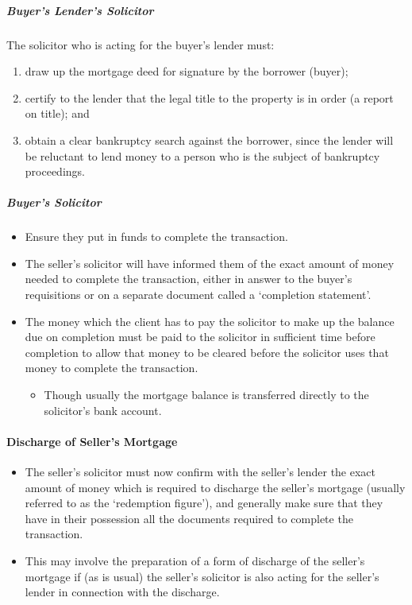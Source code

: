 \documentclass[
]{article}
\providecommand{\tightlist}{%
  \setlength{\itemsep}{0pt}\setlength{\parskip}{0pt}}
\begin{document}
\hypertarget{buyers-lenders-solicitor}{%
\subparagraph{Buyer's Lender's
Solicitor}\label{buyers-lenders-solicitor}}

The solicitor who is acting for the buyer's lender must:

\begin{enumerate}
\tightlist
\item
  draw up the mortgage deed for signature by the borrower (buyer);
\item
  certify to the lender that the legal title to the property is in order
  (a report on title); and
\item
  obtain a clear bankruptcy search against the borrower, since the
  lender will be reluctant to lend money to a person who is the subject
  of bankruptcy proceedings.
\end{enumerate}

\hypertarget{buyers-solicitor}{%
\subparagraph{Buyer's Solicitor}\label{buyers-solicitor}}

\begin{itemize}
\tightlist
\item
  Ensure they put in funds to complete the transaction.
\item
  The seller's solicitor will have informed them of the exact amount of
  money needed to complete the transaction, either in answer to the
  buyer's requisitions or on a separate document called a `completion
  statement'.
\item
  The money which the client has to pay the solicitor to make up the
  balance due on completion must be paid to the solicitor in sufficient
  time before completion to allow that money to be cleared before the
  solicitor uses that money to complete the transaction.

  \begin{itemize}
  \tightlist
  \item
    Though usually the mortgage balance is transferred directly to the
    solicitor's bank account.
  \end{itemize}
\end{itemize}

\hypertarget{discharge-of-sellers-mortgage}{%
\paragraph{Discharge of Seller's
Mortgage}\label{discharge-of-sellers-mortgage}}

\begin{itemize}
\tightlist
\item
  The seller's solicitor must now confirm with the seller's lender the
  exact amount of money which is required to discharge the seller's
  mortgage (usually referred to as the `redemption figure'), and
  generally make sure that they have in their possession all the
  documents required to complete the transaction.
\item
  This may involve the preparation of a form of discharge of the
  seller's mortgage if (as is usual) the seller's solicitor is also
  acting for the seller's lender in connection with the discharge.
\end{itemize}
\end{document}
